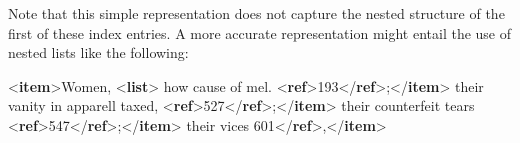 Note that this simple representation does not capture the nested structure of the first of these index entries. A more accurate representation might entail the use of nested lists like the following: \par\bgroup{}\exampleFont \begin{shaded}\noindent\mbox{}{<\textbf{item}>}Women,\mbox{}\newline 
{<\textbf{list}>}\mbox{}\newline 
\hspace*{1em}how cause of mel. {<\textbf{ref}>}193{</\textbf{ref}>};{</\textbf{item}>}\mbox{}\newline 
\hspace*{1em}their vanity in apparell taxed, {<\textbf{ref}>}527{</\textbf{ref}>};{</\textbf{item}>}\mbox{}\newline 
\hspace*{1em}their counterfeit tears {<\textbf{ref}>}547{</\textbf{ref}>};{</\textbf{item}>}\mbox{}\newline 
\hspace*{1em}their vices\mbox{}\newline 
\hspace*{1em}\mbox{}\newline 
\hspace*{1em}\hspace*{1em}\hspace*{1em}\mbox{}\newline 
\hspace*{1em}\hspace*{1em}\hspace*{1em}\hspace*{1em}601{</\textbf{ref}>},{</\textbf{item}>}\mbox{}\newline 

\end{shaded}

